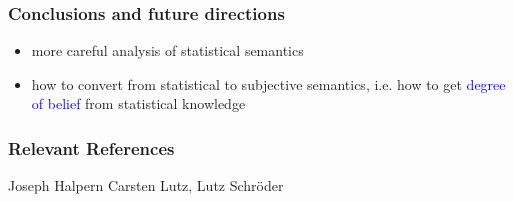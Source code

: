 \documentclass[draft]{beamer}
\renewcommand{\emph}[1]{\textcolor{blue}{#1}}
\begin{document}
\begin{frame}
  \frametitle{Conclusions and future directions}
  \begin{itemize}
    \item more careful analysis of statistical semantics
    \item how to convert from statistical to subjective semantics, \mbox{i.e.} how to get \emph{degree of belief} from statistical knowledge
  \end{itemize}
\end{frame}


\begin{frame}
  \frametitle{Relevant References}
  \begin{scriptsize}
    \begin{thebibliography}{xxxxxxxxxxxxxxxxxxxxxxxxxx}
	Joseph Halpern
	Carsten Lutz, Lutz Schr\"oder
    \end{thebibliography}
  \end{scriptsize}
\end{frame}
\end{document}
